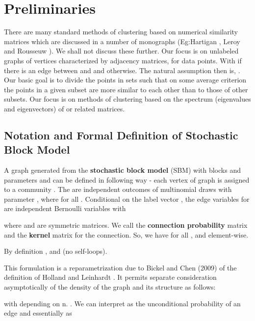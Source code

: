\documentclass[graybox]{svmult}
\begin{document}
\section{Preliminaries}
\label{sec_prel}
There are  many standard methods of clustering based on numerical similarity matrices which are discussed  in a number of monographs (Eg:Hartigan \cite{MR0405726}, Leroy and Rousseuw \cite{MR914792}). We shall not discuss these further. Our focus is on unlabeled graphs of  vertices characterized by adjacency matrices,  for  data points. With  if there is an edge between  and  and  otherwise. The natural assumption then is, . Our basic goal is to divide the points in  sets  such that on some average  criterion the points in a given subset are more similar to each other than to those of other subsets. Our focus is on methods of clustering based on the spectrum (eigenvalues and eigenvectors) of  or related matrices. 




\subsection{Notation and Formal Definition of Stochastic Block Model}
\label{sec_sbm}
\begin{definition}
\label{def_sbm}
A graph  generated from the \textbf{stochastic block model} (SBM) with  blocks and parameters  and  can be defined in following way - each vertex of graph  is assigned to a community . The  are independent outcomes of multinomial draws with parameter , where  for all . Conditional on the label vector , the edge variables  for  are independent Bernoulli variables with

where  and  are  symmetric matrices. We call  the \textbf{connection probability} matrix and  the \textbf{kernel} matrix for the connection. So, we have  for all ,  and  element-wise.
\end{definition}
By definition , and  (no self-loops). 

This formulation is a reparametrization due to Bickel and Chen (2009) \cite{bickel2009nonparametric} of the definition of Holland and Leinhardt \cite{holland1983stochastic}. It permits separate consideration asymptotically of the density of the graph and its structure as follows:

with   depending on n. . We can interpret   as the unconditional  probability of an edge and  essentially as  
\end{document}
